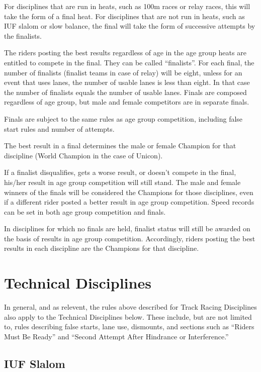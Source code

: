 For disciplines that are run in heats, such as 100m races or relay races, this will take the form of a final heat.
For disciplines that are not run in heats, such as IUF slalom or slow balance, the final will take the form of successive attempts by the finalists.

The riders posting the best results regardless of age in the age group heats are entitled to compete in the final.
They can be called ``finalists''.
For each final, the number of finalists (finalist teams in case of relay) will be eight, unless for an event that uses lanes, the number of usable lanes is less than eight.
In that case the number of finalists equals the number of usable lanes.
Finals are composed regardless of age group, but male and female competitors are in separate finals.

Finals are subject to the same rules as age group competition, including false start rules and number of attempts.

The best result in a final determines the male or female Champion for that discipline (World Champion in the case of Unicon).

If a finalist disqualifies, gets a worse result, or doesn't compete in the final, his/her result in age group competition will still stand.
The male and female winners of the finals will be considered the Champions for those disciplines, even if a different rider posted a better result in age group competition.
Speed records can be set in both age group competition and finals.

In disciplines for which no finals are held, finalist status will still be awarded on the basis of results in age group competition.
Accordingly, riders posting the best results in each discipline are the Champions for that discipline.

\section{Technical Disciplines}

In general, and as relevent, the rules above described for Track Racing Disciplines also apply to the Technical Disciplines below. These include, but are not limited to, rules describing false starts, lane use, dismounts, and sections such as ``Riders Must Be Ready'' and ``Second Attempt After Hindrance or Interference.''

\subsection{IUF Slalom}

